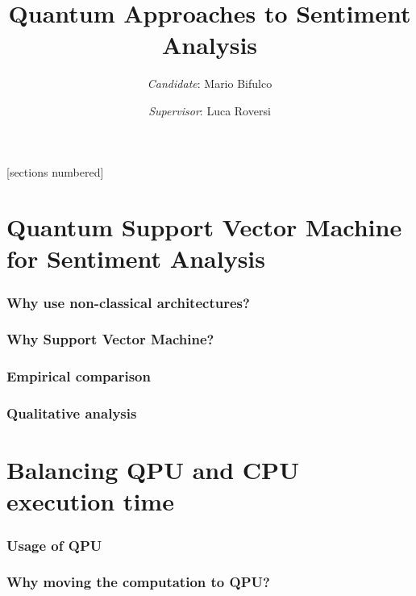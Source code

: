 \documentclass[aspectratio=169]{beamer}
\title{Quantum Approaches to Sentiment Analysis}
\author{\emph{Candidate}: Mario Bifulco}
\date{\emph{Supervisor}: Luca Roversi}
\institute{University of Turin}
\begin{document}
[sections numbered]

\begin{frame}
    \titlepage
\end{frame}


\section{Quantum Support Vector Machine for Sentiment Analysis}

\begin{frame}
    \frametitle{Why use non-classical architectures?}

    

\end{frame}

\begin{frame}
    \frametitle{Why Support Vector Machine?}

    

\end{frame}

\begin{frame}
    \frametitle{Empirical comparison}

    

\end{frame}

\begin{frame}
    \frametitle{Qualitative analysis}

    

\end{frame}

\section{Balancing QPU and CPU execution time}

\begin{frame}
    \frametitle{Usage of QPU}

    

\end{frame}

\begin{frame}
    \frametitle{Why moving the computation to QPU?}

    

\end{frame}
\end{document}
